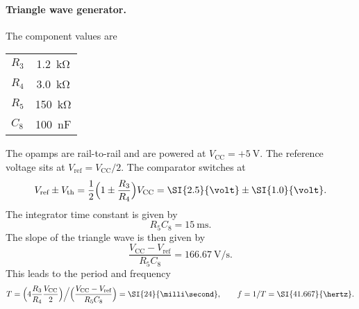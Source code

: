\documentclass[a4paper]{article}
\begin{document}
\paragraph{Triangle wave generator.}
\begin{center}
\end{center}
The component values are
\begin{center}
  \begin{tabular}{lS}
    \toprule
    $R_3$ & \SI{1.2}{\kilo\ohm} \\
    $R_4$ & \SI{3.0}{\kilo\ohm} \\
    $R_5$ & \SI{150}{\kilo\ohm} \\
    $C_8$ & \SI{100}{\nano\farad} \\
    \bottomrule
  \end{tabular}
\end{center}
The opamps are rail-to-rail and are powered at $V_{\text{CC}} = +\SI{5}{\volt}$. The reference voltage sits at $V_{\text{ref}} = V_{\text{CC}}/2$. The comparator switches at
\begin{equation}
  V_{\text{ref}} \pm V_{\text{th}} = \frac{1}{2} \Bigl( 1 \pm \frac{R_3}{R_4} \Bigr) V_{\text{CC}}
  =
  \SI{2.5}{\volt} \pm \SI{1.0}{\volt} .
\end{equation}
The integrator time constant is given by
\begin{equation}
  R_5 C_8 = \SI{15}{\milli\second}.
\end{equation}
The slope of the triangle wave is then given by
\begin{equation}
  \frac{V_{\text{CC}} - V_{\text{ref}}}{R_5 C_8} = \SI{166.67}{\volt/\second} .
\end{equation}
This leads to the period and frequency
\begin{equation}
  T = \Bigl( 4 \frac{R_3}{R_4} \frac{V_{\text{CC}}}{2} \Bigr) \Big/ \Bigl( \frac{V_{\text{CC}} - V_{\text{ref}}}{R_5 C_8} \Bigr) = \SI{24}{\milli\second} , \qquad
  f = 1/T = \SI{41.667}{\hertz} .
\end{equation}
\end{document}
